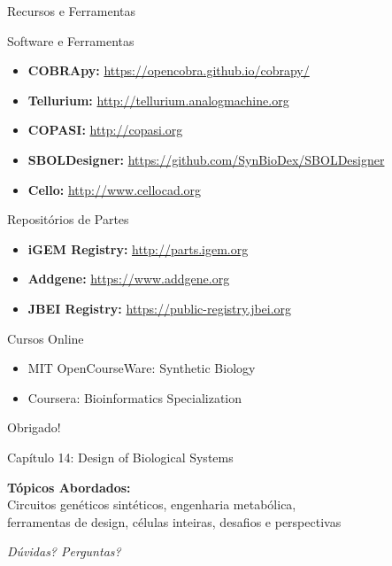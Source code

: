 \begin{frame}{Recursos e Ferramentas}
\begin{block}{Software e Ferramentas}
\begin{itemize}
    \item \textbf{COBRApy:} \url{https://opencobra.github.io/cobrapy/}
    \item \textbf{Tellurium:} \url{http://tellurium.analogmachine.org}
    \item \textbf{COPASI:} \url{http://copasi.org}
    \item \textbf{SBOLDesigner:} \url{https://github.com/SynBioDex/SBOLDesigner}
    \item \textbf{Cello:} \url{http://www.cellocad.org}
\end{itemize}
\end{block}

\begin{block}{Repositórios de Partes}
\begin{itemize}
    \item \textbf{iGEM Registry:} \url{http://parts.igem.org}
    \item \textbf{Addgene:} \url{https://www.addgene.org}
    \item \textbf{JBEI Registry:} \url{https://public-registry.jbei.org}
\end{itemize}
\end{block}

\begin{block}{Cursos Online}
\begin{itemize}
    \item MIT OpenCourseWare: Synthetic Biology
    \item Coursera: Bioinformatics Specialization
\end{itemize}
\end{block}
\end{frame}

\begin{frame}
\begin{center}
{\Huge Obrigado!}

\vspace{1cm}

{\Large Capítulo 14: Design of Biological Systems}

\vspace{1cm}

\textbf{Tópicos Abordados:}\\
Circuitos genéticos sintéticos, engenharia metabólica,\\
ferramentas de design, células inteiras, desafios e perspectivas

\vspace{1cm}

\textit{Dúvidas? Perguntas?}
\end{center}
\end{frame}


